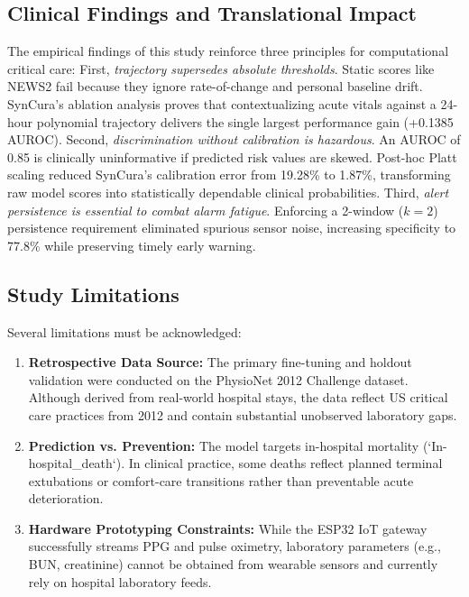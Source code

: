 \documentclass[conference]{IEEEtran}
\begin{document}
\subsection{Clinical Findings and Translational Impact}
The empirical findings of this study reinforce three principles for computational critical care:
First, \textit{trajectory supersedes absolute thresholds}. Static scores like NEWS2 fail because they ignore rate-of-change and personal baseline drift. SynCura's ablation analysis proves that contextualizing acute vitals against a 24-hour polynomial trajectory delivers the single largest performance gain (+0.1385 AUROC).
Second, \textit{discrimination without calibration is hazardous}. An AUROC of 0.85 is clinically uninformative if predicted risk values are skewed. Post-hoc Platt scaling reduced SynCura's calibration error from 19.28\% to 1.87\%, transforming raw model scores into statistically dependable clinical probabilities.
Third, \textit{alert persistence is essential to combat alarm fatigue}. Enforcing a 2-window ($k=2$) persistence requirement eliminated spurious sensor noise, increasing specificity to 77.8\% while preserving timely early warning.

\subsection{Study Limitations}
Several limitations must be acknowledged:
\begin{enumerate}
    \item \textbf{Retrospective Data Source:} The primary fine-tuning and holdout validation were conducted on the PhysioNet 2012 Challenge dataset. Although derived from real-world hospital stays, the data reflect US critical care practices from 2012 and contain substantial unobserved laboratory gaps.
    \item \textbf{Prediction vs. Prevention:} The model targets in-hospital mortality (`In-hospital\_death`). In clinical practice, some deaths reflect planned terminal extubations or comfort-care transitions rather than preventable acute deterioration.
    \item \textbf{Hardware Prototyping Constraints:} While the ESP32 IoT gateway successfully streams PPG and pulse oximetry, laboratory parameters (e.g., BUN, creatinine) cannot be obtained from wearable sensors and currently rely on hospital laboratory feeds.
\end{enumerate}
\end{document}
